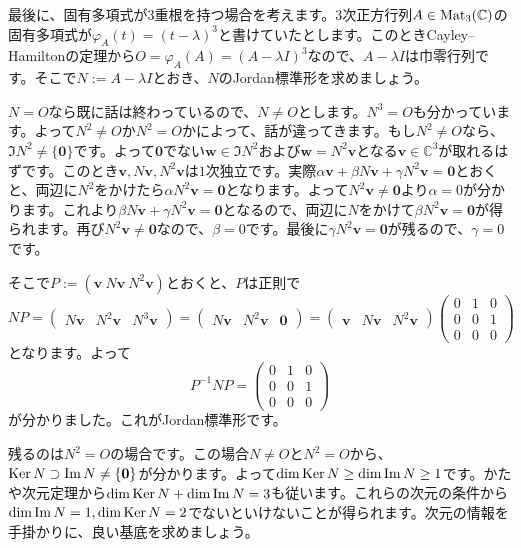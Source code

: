 最後に、固有多項式が$3$重根を持つ場合を考えます。$3$次正方行列$A \in \operatorname{Mat}_3(\mathbb{C})$の固有多項式が$\varphi_A(t) = (t - \lambda)^3$と書けていたとします。このときCayley--Hamiltonの定理から$O = \varphi_A(A) = (A - \lambda I)^3$なので、$A - \lambda I$は巾零行列です。そこで$N := A - \lambda I$とおき、$N$のJordan標準形を求めましょう。

$N = O$なら既に話は終わっているので、$N \neq O$とします。$N^3 = O$も分かっています。よって$N^2 \neq O$か$N^2 = O$かによって、話が違ってきます。もし$N^2 \neq O$なら、$\Im N^2 \neq \{\bm{0}\}$です。よって$\bm{0}$でない$\bm{w} \in \Im N^2$および$\bm{w} = N^2 \bm{v}$となる$\bm{v} \in \mathbb{C}^3$が取れるはずです。このとき$\bm{v}, N\bm{v}, N^2 \bm{v}$は$1$次独立です。実際$\alpha \bm{v} + \beta N\bm{v} + \gamma N^2 \bm{v} = \bm{0}$とおくと、両辺に$N^2$をかけたら$\alpha N^2\bm{v} = \bm{0}$となります。よって$N^2 \bm{v} \neq \bm{0}$より$\alpha = 0$が分かります。これより$\beta N\bm{v} + \gamma N^2 \bm{v} = \bm{0}$となるので、両辺に$N$をかけて$\beta N^2 \bm{v} = \bm{0}$が得られます。再び$N^2 \bm{v} \neq \bm{0}$なので、$\beta = 0$です。最後に$\gamma N^2\bm{v} = \bm{0}$が残るので、$\gamma = 0$です。

そこで$P:= (\bm{v} \  N\bm{v} \ N^2\bm{v})$とおくと、$P$は正則で
\[
NP = 
\begin{pmatrix}
N\bm{v} & N^2\bm{v} & N^3 \bm{v}
\end{pmatrix}
=
\begin{pmatrix}
N\bm{v} & N^2\bm{v} & \bm{0}
\end{pmatrix}
=
\begin{pmatrix}
\bm{v} & N\bm{v} & N^2 \bm{v}
\end{pmatrix}
\begin{pmatrix}
0 & 1 & 0 \\
0 & 0 & 1 \\
0 & 0 & 0
\end{pmatrix}
\]
となります。よって
\[
P^{-1} NP =
\begin{pmatrix}
0 & 1 & 0 \\
0 & 0 & 1 \\
0 & 0 & 0
\end{pmatrix}
\]
が分かりました。これがJordan標準形です。

残るのは$N^2 = O$の場合です。この場合$N \neq O$と$N^2 = O$から、$\operatorname{Ker} N \supset \mathrm{Im}\, N \neq \{\boldsymbol{0}\}$が分かります。よって$\dim \operatorname{Ker} N \geq \dim \mathrm{Im}\, N \geq 1$です。かたや次元定理から$\dim \operatorname{Ker} N + \dim \mathrm{Im}\, N = 3$も従います。これらの次元の条件から$\dim \mathrm{Im}\, N = 1, \dim \operatorname{Ker} N = 2$でないといけないことが得られます。次元の情報を手掛かりに、良い基底を求めましょう。

